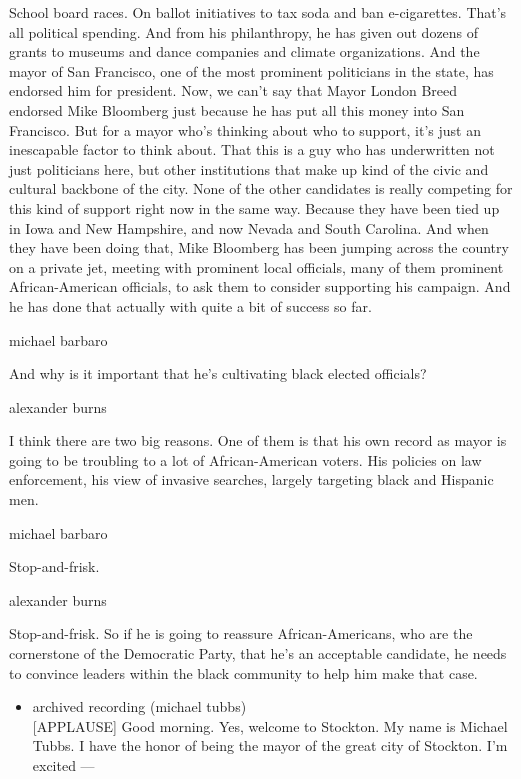 School board races. On ballot initiatives to tax soda and ban
e-cigarettes. That's all political spending. And from his philanthropy,
he has given out dozens of grants to museums and dance companies and
climate organizations. And the mayor of San Francisco, one of the most
prominent politicians in the state, has endorsed him for president. Now,
we can't say that Mayor London Breed endorsed Mike Bloomberg just
because he has put all this money into San Francisco. But for a mayor
who's thinking about who to support, it's just an inescapable factor to
think about. That this is a guy who has underwritten not just
politicians here, but other institutions that make up kind of the civic
and cultural backbone of the city. None of the other candidates is
really competing for this kind of support right now in the same way.
Because they have been tied up in Iowa and New Hampshire, and now Nevada
and South Carolina. And when they have been doing that, Mike Bloomberg
has been jumping across the country on a private jet, meeting with
prominent local officials, many of them prominent African-American
officials, to ask them to consider supporting his campaign. And he has
done that actually with quite a bit of success so far.

michael barbaro

And why is it important that he's cultivating black elected officials?

alexander burns

I think there are two big reasons. One of them is that his own record as
mayor is going to be troubling to a lot of African-American voters. His
policies on law enforcement, his view of invasive searches, largely
targeting black and Hispanic men.

michael barbaro

Stop-and-frisk.

alexander burns

Stop-and-frisk. So if he is going to reassure African-Americans, who are
the cornerstone of the Democratic Party, that he's an acceptable
candidate, he needs to convince leaders within the black community to
help him make that case.

\begin{itemize}
\tightlist
\item
  archived recording (michael tubbs)\\
  {[}APPLAUSE{]} Good morning. Yes, welcome to Stockton. My name is
  Michael Tubbs. I have the honor of being the mayor of the great city
  of Stockton. I'm excited ---
\end{itemize}

